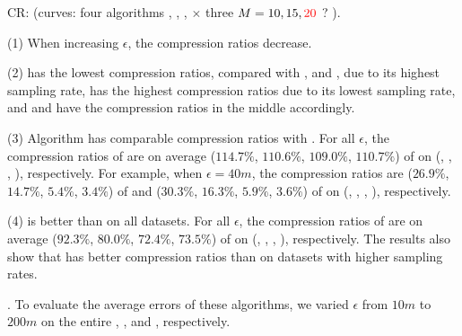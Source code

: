 CR: (\textcolor[rgb]{0.00,0.07,1.00}{curves: four algorithms \cist, \cista, \dpa, \squishe  $\times$  three $M = 10, 15, \textcolor[rgb]{1.00,0.00,0.00}{20}$ ? }).

\ni (1) When increasing $\epsilon$, the compression ratios decrease.


\ni (2) \pricar has the lowest compression ratios, compared with \truck, \sercar and \geolife, due to its highest sampling rate,
\truck has the highest compression ratios due to its lowest sampling rate, and \sercar and \geolife have the compression ratios in the middle accordingly.

\ni (3) Algorithm \cist has \textcolor[rgb]{1.00,0.00,0.00}{comparable} compression ratios with \dpa.
For all $\epsilon$, the compression ratios of \cist are on average ($114.7\%$, $110.6\%$, $109.0\%$, $110.7\%$) of \dpa on (\truck, \sercar, \geolife, \pricar), respectively.
For example, when $\epsilon = 40m$, the compression ratios are ($26.9\%$, $14.7\%$, $5.4\%$, $3.4\%$) of \dpa and ($30.3\%$, $16.3\%$, $5.9\%$, $3.6\%$) of \cist on (\truck, \sercar, \geolife, \pricar), respectively.

\ni (4) \cist is better than  \squishe on all datasets.
For all $\epsilon$, the compression ratios of \cist are on average ($92.3\%$, $80.0\%$, $72.4\%$, {$73.5\%$}) of \squishe on (\truck, \sercar, \geolife, \pricar), respectively.
The results also show that \cist has better compression ratios than \squishe on datasets with higher sampling rates.




.
To evaluate the average errors of these algorithms, we varied $\epsilon$ from $10m$ to $200m$ on the entire \truck, \sercar, \geolife and \pricar, respectively.

